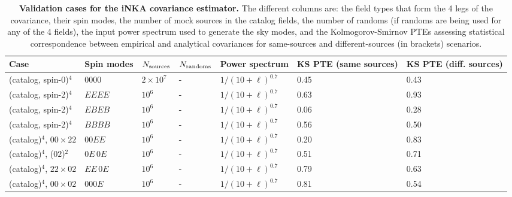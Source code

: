 \documentclass[aps,twocolumn, superscriptaddress, english, nofootinbib, 10pt]{revtex4-2}
\begin{document}
    \begin{table}[t]
    \caption{\textbf{Validation cases for the iNKA covariance estimator.} The different columns are: the field types that form the 4 legs of the covariance, their spin modes, the number of mock sources in the catalog fields, the number of randoms (if randoms are being used for any of the 4 fields), the input power spectrum used to generate the sky modes, and the Kolmogorov-Smirnov PTEs assessing statistical correspondence  between empirical and analytical covariances for same-sources and different-sources (in brackets) scenarios.}
    \centering
    \scriptsize
    \setlength{\tabcolsep}{3pt}
    \renewcommand{\arraystretch}{1.12}
    
    \begin{tabular}{@{} l l l l l p{} p{}@{}}
    \toprule
    Case
    & Spin modes
    & $N_{\rm sources}$
    & $N_{\rm randoms}$
    & Power spectrum
    & KS PTE (same sources)
    & KS PTE (diff. sources)\\
    \midrule
    
    (catalog, spin-0)$^4$
    & $0000$
    & $2\times 10^7$
    & -
    & $1/(10+\ell)^{0.7}$
    & 0.45 & 0.43 \\

    (catalog, spin-2)$^4$
    & $EEEE$
    & $10^6$
    & -
    & $1/(10+\ell)^{0.7}$
    & 0.63 & 0.93 \\

    (catalog, spin-2)$^4$
    & $EBEB$
    & $10^6$
    & -
    & $1/(10+\ell)^{0.7}$
    & 0.06 & 0.28 \\

    (catalog, spin-2)$^4$
    & $BBBB$
    & $10^6$
    & -
    & $1/(10+\ell)^{0.7}$
    & 0.56 & 0.50 \\

    (catalog)$^4$, $00\times22$ 
    & $00EE$
    & $10^6$
    & -
    & $1/(10+\ell)^{0.7}$
    & 0.20 & 0.83 \\
    
    (catalog)$^4$, ($02$)$^2$
    & $0E\,0E$
    & $10^6$
    & -
    & $1/(10+\ell)^{0.7}$
    & 0.51 & 0.71 \\
    
    (catalog)$^4$, $22\times02$
    & $EE\,0E$
    & $10^6$
    & -
    & $1/(10+\ell)^{0.7}$
    & 0.79 & 0.63 \\
    
    (catalog)$^4$, $00\times02$
    & $000E$
    & $10^6$
    & -
    & $1/(10+\ell)^{0.7}$
    & 0.81 & 0.54  \\
    

\end{tabular}
\end{table}
\end{document}
